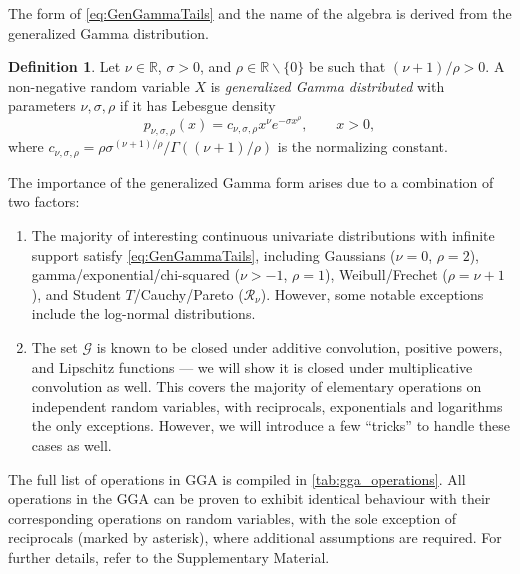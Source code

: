 \documentclass{article}
\theoremstyle{definition}
\newtheorem{definition}{Definition}
\begin{document}
The form of \cref{eq:GenGammaTails} and the name of the algebra is derived from the generalized Gamma distribution. 
\begin{definition}
Let $\nu \in \mathbb{R}$, $\sigma > 0$, and $\rho \in \mathbb{R} \backslash \{0\}$ be such that $(\nu+1)/ \rho > 0$.
A non-negative random variable $X$ is \emph{generalized Gamma distributed} with parameters $\nu,\sigma,\rho$ if it has Lebesgue density
\begin{equation}
\label{eq:GenGammaDensity}
p_{\nu,\sigma,\rho}(x) = c_{\nu,\sigma,\rho} x^\nu e^{-\sigma x^\rho},\qquad x > 0,
\end{equation}
where $c_{\nu,\sigma,\rho} = \rho \sigma^{(\nu+1)/\rho} / \Gamma((\nu+1)/\rho)$ is the normalizing constant. %
\end{definition}
The importance of the generalized Gamma form arises due to a combination of two factors:
\begin{enumerate}[label={(\roman*)},leftmargin=*]
    \item The majority of interesting continuous univariate distributions with infinite support satisfy \cref{eq:GenGammaTails}, including
    Gaussians ($\nu=0$, $\rho=2$),
    gamma/exponential/chi-squared ($\nu > -1$, $\rho=1$), Weibull/Frechet ($\rho = \nu + 1$), and
    Student $T$/Cauchy/Pareto ($\mathcal{R}_\nu$).
    However, some notable exceptions include the log-normal distributions. 
    \item The set $\mathcal{G}$ is known to be closed under additive convolution, positive powers, and Lipschitz functions --- we will show it is closed under multiplicative convolution as well. This covers the majority of elementary operations on independent random variables, with reciprocals, exponentials and logarithms the only exceptions. However, we will introduce a few ``tricks'' to handle these cases as well. 
\end{enumerate}
The full list of operations in GGA is compiled in \cref{tab:gga_operations}. All operations in the GGA can be proven to exhibit identical behaviour with their corresponding operations on random variables, with the sole exception of reciprocals (marked by asterisk), where additional assumptions are required. For further details, refer to the Supplementary Material.

\end{document}
